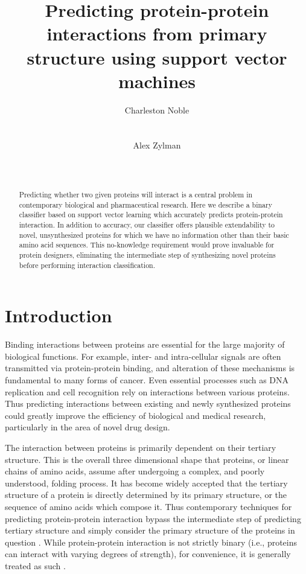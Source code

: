 \documentclass{acm_proc_article-sp}
\begin{document}
\title{Predicting protein-protein interactions from primary structure using support vector machines}
\author{
\alignauthor
Charleston Noble\\
	 \\
	\\
\alignauthor
Alex Zylman\\
	 \\
	\\
}
\maketitle
\begin{abstract}
Predicting whether two given proteins will interact is a central problem in contemporary biological and pharmaceutical research. Here we describe a binary classifier based on support vector learning which accurately predicts protein-protein interaction. In addition to accuracy, our classifier offers plausible extendability to novel, unsynthesized proteins for which we have no information other than their basic amino acid sequences. This no-knowledge requirement would prove invaluable for protein designers, eliminating the intermediate step of synthesizing novel proteins before performing interaction classification.
\end{abstract}

\section{Introduction}
Binding interactions between proteins are essential for the large majority of biological functions. For example, inter- and intra-cellular signals are often transmitted via protein-protein binding, and alteration of these mechanisms is fundamental to many forms of cancer. Even essential processes such as DNA replication and cell recognition rely on interactions between various proteins. Thus predicting interactions between existing and newly synthesized proteins could greatly improve the efficiency of biological and medical research, particularly in the area of novel drug design.

The interaction between proteins is primarily dependent on their tertiary structure. This is the overall three dimensional shape that proteins, or linear chains of amino acids, assume after undergoing a complex, and poorly understood, folding process. It has become widely accepted that the tertiary structure of a protein is directly determined by its primary structure, or the sequence of amino acids which compose it. Thus contemporary techniques for predicting protein-protein interaction bypass the intermediate step of predicting tertiary structure and simply consider the primary structure of the proteins in question \cite{BockNGough}. While protein-protein interaction is not strictly binary (i.e., proteins can interact with varying degrees of strength), for convenience, it is generally treated as such \cite{Yu}.
\end{document}
